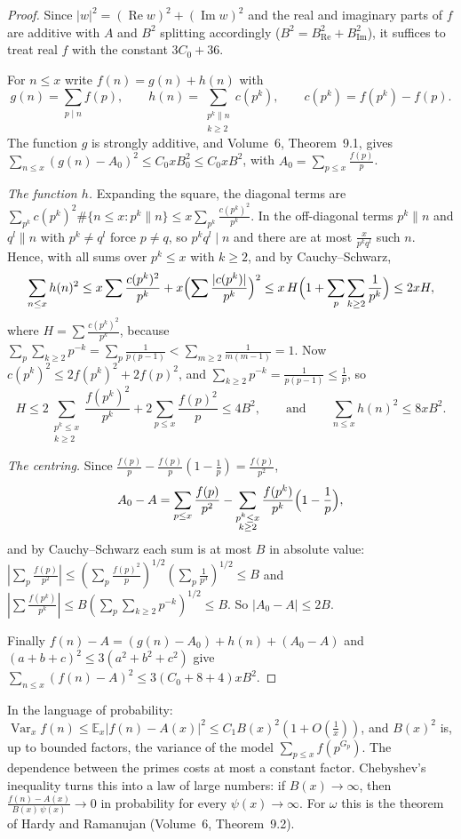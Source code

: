 \begin{proof}
Since $|w|^2=(\operatorname{Re}w)^2+(\operatorname{Im}w)^2$ and the real and imaginary parts of $f$ are additive with $A$ and $B^2$ splitting accordingly ($B^2=B_{\operatorname{Re}}^2+B_{\operatorname{Im}}^2$), it suffices to treat real $f$ with the constant $3C_0+36$.

For $n\le x$ write $f(n)=g(n)+h(n)$ with
\[
g(n)=\sum_{p\mid n}f(p),\qquad h(n)=\sum_{\substack{p^k\parallel n\\k\ge2}}c(p^k),\qquad c(p^k)=f(p^k)-f(p).
\]
The function $g$ is strongly additive, and Volume~6, Theorem~9.1, gives $\sum_{n\le x}(g(n)-A_0)^2\le C_0xB_0^2\le C_0xB^2$, with $A_0=\sum_{p\le x}\frac{f(p)}p$.

\emph{The function $h$.} Expanding the square, the diagonal terms are $\sum_{p^k}c(p^k)^2\#\{n\le x:p^k\parallel n\}\le x\sum_{p^k}\frac{c(p^k)^2}{p^k}$. In the off-diagonal terms $p^k\parallel n$ and $q^l\parallel n$ with $p^k\ne q^l$ force $p\ne q$, so $p^kq^l\mid n$ and there are at most $\frac x{p^kq^l}$ such $n$. Hence, with all sums over $p^k\le x$ with $k\ge2$, and by Cauchy--Schwarz,
\[
\sum_{n\le x}h(n)^2\le x\sum\frac{c(p^k)^2}{p^k}+x\Bigl(\sum\frac{|c(p^k)|}{p^k}\Bigr)^2\le x\,H\Bigl(1+\sum_p\sum_{k\ge2}\frac1{p^k}\Bigr)\le2xH,
\]
where $H=\sum\frac{c(p^k)^2}{p^k}$, because $\sum_p\sum_{k\ge2}p^{-k}=\sum_p\frac1{p(p-1)}<\sum_{m\ge2}\frac1{m(m-1)}=1$. Now $c(p^k)^2\le2f(p^k)^2+2f(p)^2$, and $\sum_{k\ge2}p^{-k}=\frac1{p(p-1)}\le\frac1p$, so
\[
H\le2\sum_{\substack{p^k\le x\\k\ge2}}\frac{f(p^k)^2}{p^k}+2\sum_{p\le x}\frac{f(p)^2}p\le4B^2,\qquad\text{and}\qquad\sum_{n\le x}h(n)^2\le8xB^2.
\]

\emph{The centring.} Since $\frac{f(p)}p-\frac{f(p)}p(1-\frac1p)=\frac{f(p)}{p^2}$,
\[
A_0-A=\sum_{p\le x}\frac{f(p)}{p^2}-\sum_{\substack{p^k\le x\\k\ge2}}\frac{f(p^k)}{p^k}\Bigl(1-\frac1p\Bigr),
\]
and by Cauchy--Schwarz each sum is at most $B$ in absolute value: $|\sum_p\frac{f(p)}{p^2}|\le(\sum_p\frac{f(p)^2}p)^{1/2}(\sum_p\frac1{p^3})^{1/2}\le B$ and $|\sum\frac{f(p^k)}{p^k}|\le B(\sum_p\sum_{k\ge2}p^{-k})^{1/2}\le B$. So $|A_0-A|\le2B$.

Finally $f(n)-A=(g(n)-A_0)+h(n)+(A_0-A)$ and $(a+b+c)^2\le3(a^2+b^2+c^2)$ give $\sum_{n\le x}(f(n)-A)^2\le3(C_0+8+4)xB^2$.
\end{proof}

In the language of probability: $\operatorname{Var}_xf(n)\le\mathbb E_x|f(n)-A(x)|^2\le C_1B(x)^2(1+O(\frac1x))$, and $B(x)^2$ is, up to bounded factors, the variance of the model $\sum_{p\le x}f(p^{G_p})$. The dependence between the primes costs at most a constant factor. Chebyshev's inequality turns this into a law of large numbers: if $B(x)\to\infty$, then $\frac{f(n)-A(x)}{B(x)\,\psi(x)}\to0$ in probability for every $\psi(x)\to\infty$. For $\omega$ this is the theorem of Hardy and Ramanujan (Volume~6, Theorem~9.2).

